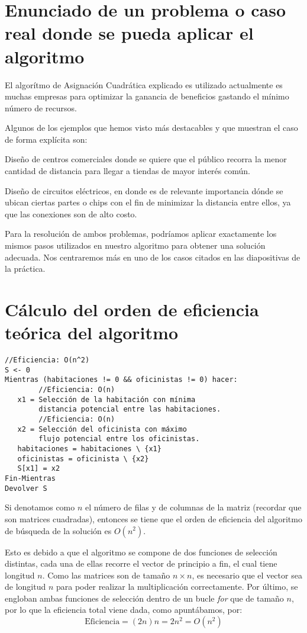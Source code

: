 \documentclass[11pt, a4paper]{article}
\theoremstyle{theorem-style}
\theoremstyle{definition-style}
\theoremstyle{remark-style}
\theoremstyle{example-style}
\begin{document}
\section{Enunciado de un problema o caso real donde se pueda aplicar el algoritmo}

El algorítmo de Asignación Cuadrática explicado es utilizado actualmente es muchas empresas para optimizar la ganancia de beneficios gastando el mínimo número de recursos.

Algunos de los ejemplos que hemos visto más destacables y que muestran el caso de forma explícita son:

Diseño de centros comerciales donde se quiere que el público recorra
la menor cantidad de distancia para llegar a tiendas de mayor interés común. 

Diseño de circuitos eléctricos, en donde es de relevante importancia
dónde se ubican ciertas partes o chips con el fin de minimizar la
distancia entre ellos, ya que las conexiones son de alto costo.

Para la resolución de ambos problemas, podríamos aplicar exactamente los mismos pasos utilizados en nuestro algoritmo para obtener una solución adecuada. Nos centraremos más en uno de los casos citados en las diapositivas de la práctica.

\section{Cálculo del orden de eficiencia teórica del algoritmo }
\begin{verbatim}
//Eficiencia: O(n^2)
S <- 0
Mientras (habitaciones != 0 && oficinistas != 0) hacer:
        //Eficiencia: O(n)
   x1 = Selección de la habitación con mínima 
        distancia potencial entre las habitaciones.
        //Eficiencia: O(n)
   x2 = Selección del oficinista con máximo 
        flujo potencial entre los oficinistas.
   habitaciones = habitaciones \ {x1}
   oficinistas = oficinista \ {x2}
   S[x1] = x2
Fin-Mientras
Devolver S
\end{verbatim}
Si denotamos como $n$ el número de filas y de columnas de la matriz (recordar que son matrices cuadradas), entonces se tiene que el orden de eficiencia del algoritmo de búsqueda de la solución es $O(n^2)$.

Esto es debido a que el algoritmo se compone de dos funciones de selección distintas, cada una de ellas recorre el vector de principio a fin, el cual tiene longitud $n$.  Como las matrices son de tamaño $n\times n$, es necesario que el vector sea de longitud $n$ para poder realizar la multiplicación correctamente. Por último, se engloban ambas funciones de selección dentro de un bucle \textit{for} que de tamaño $n$, por lo que la eficiencia total viene dada, como apuntábamos, por:
$$\textrm{Eficiencia}= (2n)n=2n^2=O(n^2)$$
\end{document}
